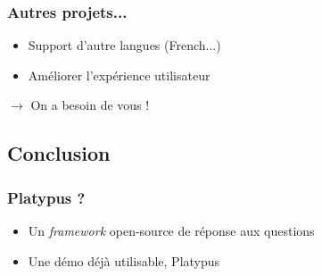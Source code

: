 \begin{frame}
    \frametitle{Autres projets...}

    \begin{itemize}
        \item Support d'autre langues (French...)
        \item Améliorer l'expérience utilisateur
    \end{itemize}
    
    \pause
     \medbreak

    $\rightarrow$ On a besoin de vous !
\end{frame}

\subsection{Conclusion}

\begin{frame}
    \frametitle{Platypus ?}

    \begin{itemize}
        \item Un \textit{framework} open-source de réponse aux questions
        \item Une démo déjà utilisable, \alert{Platypus}
    \end{itemize}
\end{frame}


